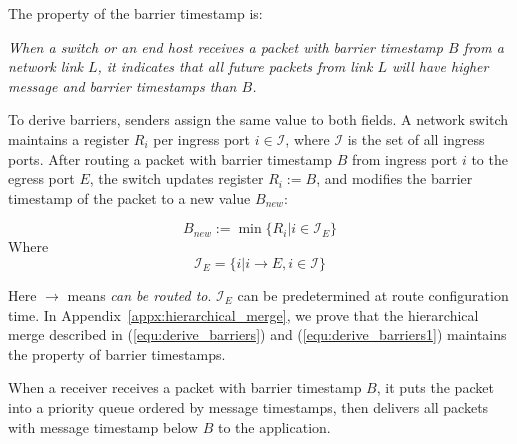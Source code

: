 The property of the barrier timestamp is:

\emph{When a switch or an end host receives a packet with barrier timestamp $B$ from a network link $L$, it indicates that all future packets from link $L$ will have higher message and barrier timestamps than $B$.}

To derive barriers, senders assign the same value to both fields.
A network switch maintains a register $R_i$ per ingress port $i \in \mathcal{I}$, where $\mathcal{I}$ is the set of all ingress ports.
After routing a packet with barrier timestamp $B$ from ingress port $i$ to the egress port $E$, the switch updates register $R_i := B$, and modifies the barrier timestamp of the packet to a new value $B_{new}$:

\begin{equation}\label{equ:derive_barriers}
B_{new}:=\min\{R_i| i\in \mathcal{I}_E\}
\end{equation}
Where 
\begin{equation}\label{equ:derive_barriers1}
\mathcal{I}_E =\{i| i\rightarrow E, i \in \mathcal{I} \}
\end{equation}

Here $\rightarrow$ means \textit{can be routed to}.
$\mathcal{I}_E$ can be predetermined at route configuration time.
In Appendix~\ref{appx:hierarchical_merge}, we prove that the hierarchical merge described in (\ref{equ:derive_barriers}) and (\ref{equ:derive_barriers1}) maintains the property of barrier timestamps.

When a receiver receives a packet with barrier timestamp $B$, it puts the packet into a priority queue ordered by message timestamps, then delivers all packets with message timestamp below $B$ to the application.


